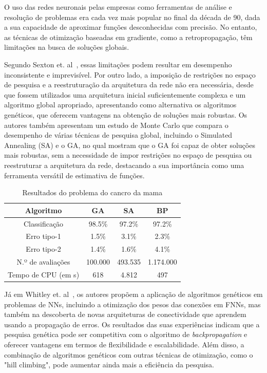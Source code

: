 \documentclass[conference]{IEEEtran}
\begin{document}
O uso das redes neuronais pelas empresas como ferramentas de análise e resolução de problemas era cada vez mais popular no final da década de 90, dada a sua capacidade de aproximar funções desconhecidas com precisão. No entanto, as técnicas de otimização baseadas em gradiente, como a retropropagação, têm limitações na busca de soluções globais.

Segundo Sexton et. al~\cite{Sexton1998, Sexton1999}, essas limitações podem resultar em desempenho inconsistente e imprevisível. Por outro lado, a imposição de restrições no espaço de pesquisa e a reestruturação da arquitetura da rede não era necessária, desde que fossem utilizados uma arquitetura inicial suficientemente complexa e um algoritmo global apropriado, apresentando como alternativa os algoritmos genéticos, que oferecem vantagens na obtenção de soluções mais robustas. Os autores também apresentam um estudo de Monte Carlo que compara o desempenho de várias técnicas de pesquisa global, incluindo o Simulated Annealing (SA) e o GA, no qual mostram que o GA foi capaz de obter soluções mais robustas, sem a necessidade de impor restrições no espaço de pesquisa ou reestruturar a arquitetura da rede, destacando a sua importância como uma ferramenta versátil de estimativa de funções.

\begin{table}[htbp]
\centering
\caption{Resultados do problema do cancro da mama\cite{Sexton1999}}
\begin{tabular}{cccc} \hline
Algoritmo & GA & SA & BP \\ \hline
Classificação & 98.5\% & 97.2\% & 97.2\% \\
Erro tipo-1 & 1.5\% & 3.1\% & 2.3\% \\
Erro tipo-2 & 1.4\% & 1.6\% & 4.1\% \\
N.º de avaliações & 100.000 & 493.535 & 1.174.000 \\
Tempo de CPU (em s)
 & 618 & 4.812 & 497 \\ \hline
\end{tabular}
\label{tab:breastcancer}
\end{table}

Já em Whitley et. al~\cite{Whitley1990}, os autores propõem a aplicação de algoritmos genéticos em problemas de NNs, incluindo a otimização dos pesos das conexões em FNNs, mas também na descoberta de novas arquiteturas de conectividade que aprendem usando a propagação de erros. Os resultados das suas experiências indicam que a pesquisa genética pode ser competitiva com o algoritmo de \textit{backpropagation} e oferecer vantagens em termos de flexibilidade e escalabilidade. Além disso, a combinação de algoritmos genéticos com outras técnicas de otimização, como o "hill climbing", pode aumentar ainda mais a eficiência da pesquisa.
\end{document}
